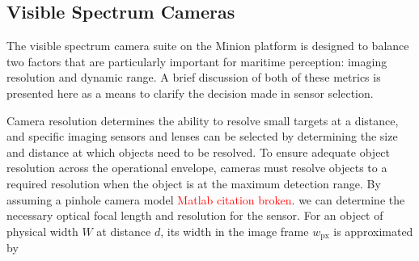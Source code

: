 \documentclass{erauthesis}
\begin{document}









\subsection{Visible Spectrum Cameras} \label{visual_cameras}

The visible spectrum camera suite on the Minion platform is designed to balance two factors that are particularly important for maritime perception: imaging resolution and dynamic range.
A brief discussion of both of these metrics is presented here as a means to clarify the decision made in sensor selection.

Camera resolution determines the ability to resolve small targets at a distance, and specific imaging sensors and lenses can be selected by determining the size and distance at which objects need to be resolved.
To ensure adequate object resolution across the operational envelope, cameras must resolve objects to a required resolution when the object is at the maximum detection range. 
By assuming a pinhole camera model \textcolor{red}{Matlab citation broken}.
we can determine the necessary optical focal length and resolution for the sensor.
For an object of physical width $W$ at distance $d$, its width in the image frame $w_{\text{px}}$ is approximated by
\end{document}

